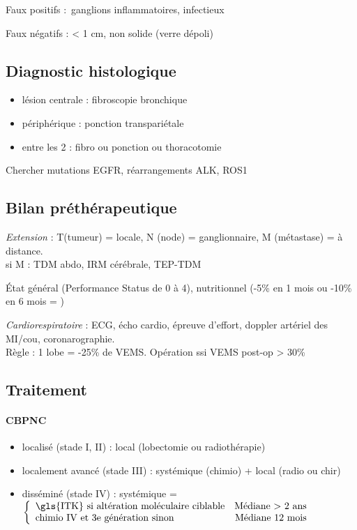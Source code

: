 \documentclass{article}
\begin{document}
Faux positifs : ganglions inflammatoires, infectieux

Faux négatifs : < 1 cm, non solide (verre dépoli)

\subsection{Diagnostic histologique}
\begin{itemize}
\item lésion centrale : fibroscopie bronchique
\item périphérique : ponction transpariétale
\item entre les 2 : fibro ou ponction ou thoracotomie
\end{itemize}
Chercher mutations EGFR, réarrangements ALK, ROS1

\subsection{Bilan préthérapeutique}
\textit{Extension}  : T(tumeur) = locale, N (node) = ganglionnaire, M
(métastase) = à distance. \\
si M : TDM abdo, IRM cérébrale, TEP-TDM

État général (Performance Status de 0 à 4), nutritionnel (-5\% en 1 mois ou
-10\% en 6 mois = \frownie{})

\textit{Cardiorespiratoire} : ECG, écho cardio, épreuve d'effort, doppler artériel des MI/cou,
coronarographie.\\
Règle : 1 lobe = -25\% de VEMS. Opération ssi VEMS post-op > 30\%
\subsection{Traitement}
\paragraph{CBPNC}
\begin{itemize}
\item localisé (stade I, II) : local (lobectomie ou radiothérapie)
\item localement avancé (stade III) : systémique (chimio) + local (radio ou
  chir)
\item disséminé (stade IV) : systémique = 
  $\left \{
    \begin{array}{lr}
      \text{\gls{ITK} si altération moléculaire ciblable} & \text{Médiane > 2 ans}\\
      \text{chimio IV et 3e génération sinon} & \text{Médiane 12 mois}\\
    \end{array}
  \right.$
\end{itemize}
\end{document}
